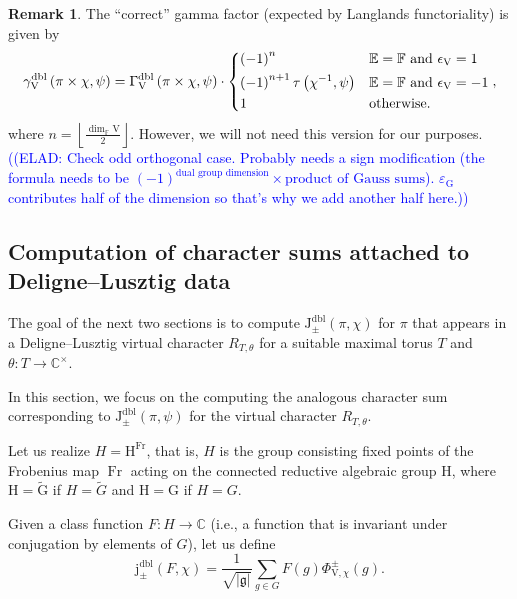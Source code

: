 \documentclass[12pt, reqno]{amsart}
\theoremstyle{definition}
\theoremstyle{definition}
\newtheorem{remark}[theorem]{Remark}
\theoremstyle{definition}
\newcommand{\cComplex}{\mathbb{C}}
\newcommand{\multiplicativegroup}[1]{#1^{\times}}
\newcommand{\sizeof}[1]{\left|#1\right|}
\newcommand{\hermitianSpace}{\mathrm{V}}
\newcommand{\fieldCharacter}{\psi}
\newcommand{\finiteField}{\mathbb{F}}
\newcommand{\quadraticExtension}{\mathbb{E}}
\newcommand{\Frobenius}{\operatorname{Fr}}
\newcommand{\genHermitianJacobiKernel}[2]{\Phi^{\pm}_{#1,#2}}
\newcommand{\dblJacobiSumScalar}[2]{\mathrm{J}_{\pm}^{\mathrm{dbl}}\left(#1, #2\right)}
\newcommand{\dblVirtualJacobiSumScalar}[2]{\mathrm{j}_{\pm}^{\mathrm{dbl}}\left(#1, #2\right)}
\newcommand{\dblGammaFactorSpace}[4]{\Gamma^{\mathrm{dbl}}_{#1}\left(#2 \times #3, #4\right)}
\newcommand{\dblLanglandsGammaFactorSpace}[4]{\gamma^{\mathrm{dbl}}_{#1}\left(#2 \times #3, #4\right)}
\newcommand{\lieAlgebra}{\mathfrak{g}}
\newcommand{\algebraicGroup}[1]{\boldsymbol{\mathrm{#1}}}
\newcommand{\elad}[1]{\textcolor{blue}{\sffamily ((ELAD: #1))}}
\begin{document}
\begin{remark}
	The ``correct'' gamma factor (expected by Langlands functoriality) is given by $$\dblLanglandsGammaFactorSpace{\hermitianSpace}{\pi}{\chi}{\fieldCharacter} = \dblGammaFactorSpace{\hermitianSpace}{\pi}{\chi}{\fieldCharacter} \cdot \begin{dcases}
				\left(-1\right)^n & \quadraticExtension = \finiteField \text{ and } \epsilon_{\hermitianSpace} = 1\\
				\left(-1\right)^{n+1} \tau\left(\chi^{-1}, \fieldCharacter\right) & \quadraticExtension = \finiteField \text{ and } \epsilon_{\hermitianSpace} = -1 \\
				1 & \text{otherwise.}
	\end{dcases},$$
	where $n = \left\lfloor \frac{\dim_{\finiteField} \hermitianSpace}{2} \right\rfloor$.
	However, we will not need this version for our purposes. \elad{Check odd orthogonal case. Probably needs a sign modification (the formula needs to be $\left(-1\right)^{\text{dual group dimension}} \times \text{product of Gauss sums}$). $\varepsilon_{\algebraicGroup{G}}$ contributes half of the dimension so that's why we add another half here.}
\end{remark}

\subsection{Computation of character sums attached to Deligne--Lusztig data}

The goal of the next two sections is to compute $\dblJacobiSumScalar{\pi}{\chi}$ for $\pi$ that appears in a Deligne--Lusztig virtual character $R_{T,\theta}$ for a suitable maximal torus $T$ and $\theta \colon T \to \multiplicativegroup{\cComplex}$.

In this section, we focus on the computing the analogous character sum corresponding to $\dblJacobiSumScalar{\pi}{\fieldCharacter}$ for the virtual character $R_{T,\theta}$.

Let us realize $H = \algebraicGroup{H}^{\Frobenius}$, that is, $H$ is the group consisting fixed points of the Frobenius map $\Frobenius$ acting on the connected reductive algebraic group $\algebraicGroup{H}$, where $\algebraicGroup{H} = \tilde{\algebraicGroup{G}}$ if $H = \tilde{G}$ and $\algebraicGroup{H} = \algebraicGroup{G}$ if $H = G$.

Given a class function $F \colon H \to \cComplex$ (i.e., a function that is invariant under conjugation by elements of $G$), let us define $$\dblVirtualJacobiSumScalar{F}{\chi} = \frac{1}{\sqrt{\sizeof{\lieAlgebra}}} \sum_{g \in G} F\left(g\right) \genHermitianJacobiKernel{\hermitianSpace}{\chi}\left(g\right).$$
\end{document}
